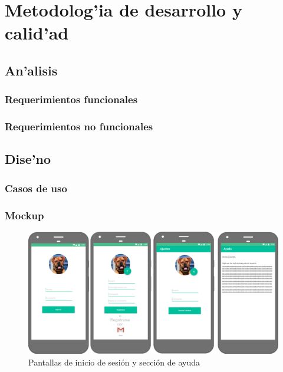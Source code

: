 \chapter{Metodolog'ia de desarrollo y calid'ad}
\section{An'alisis}
\subsection{Requerimientos funcionales}

\subsection{Requerimientos no funcionales}

\section{Dise'no}
\subsection{Casos de uso}

\subsection{Mockup}
\begin{center}
\begin{figure}
\includegraphics[scale=0.2]{img/m1.png} 
\caption{Pantallas de inicio de sesión y sección de ayuda}
\end{figure}
\end{center}

